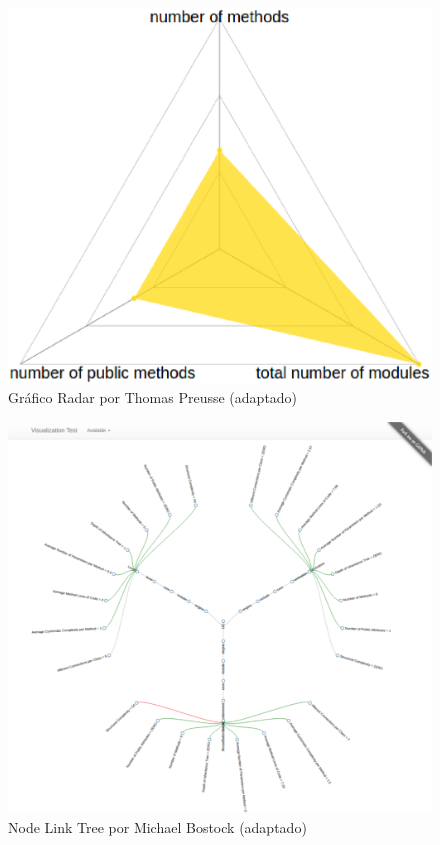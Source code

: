 \begin{figure}[!htb]
	\centering
    \includegraphics[keepaspectratio=true,scale=0.5]
    {figuras/radar.eps}
  \caption{Gráfico Radar por Thomas Preusse (adaptado)}
  \label{fig:radar}
\end{figure}

\begin{figure}[!htb]
	\centering
    \includegraphics[keepaspectratio=true,scale=0.15]
    {figuras/node_link_tree.eps}
  \caption{Node Link Tree por Michael Bostock (adaptado)}
  \label{fig:node_link_tree}
\end{figure}


